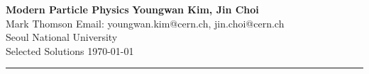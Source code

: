 \documentclass[a4paper, 11pt]{scrartcl}
\begin{document}
\noindent
\Large  \textbf{Modern Particle Physics} \hfill \large \textbf{Youngwan Kim, Jin Choi} \\
\large Mark Thomson  \hfill Email: youngwan.kim@cern.ch, jin.choi@cern.ch\\
\small \text{ }  \hfill  Seoul National University\\
\large Selected Solutions \hfill \today \\
\noindent\rule{7in}{2.8pt}



\end{document}
